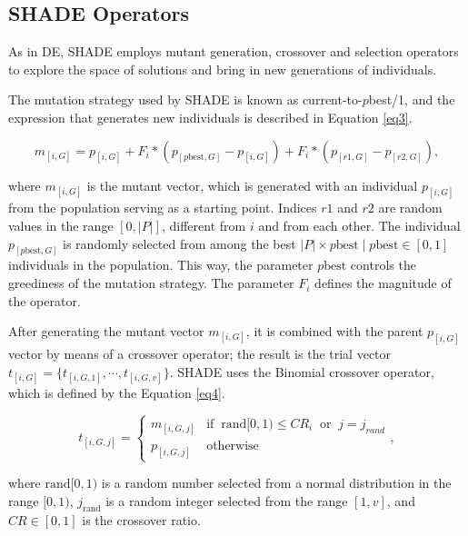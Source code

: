 \subsection{SHADE Operators}

As in \acs{DE}, \acs{SHADE} employs mutant generation, crossover and selection operators to explore the space of solutions and bring in new generations of individuals.

The mutation strategy used by \acs{SHADE} is known as current-to-$p$best/1, and the expression that generates new individuals is described in Equation \eqref{eq3}.

\begin{equation}
m_{[i,G]} = p_{[i,G]} + F_i * (p_{[p\text{best}, G]} - p_{[i,G]}) + F_i * (p_{[r1, G]} - p_{[r2,G]}),
\label{eq3}
\end{equation}

\noindent where $m_{[i,G]}$ is the mutant vector, which is generated with an individual $p_{[i,G]}$ from the population serving as a starting point. Indices $r1$ and $r2$ are random values in the range $[0,|P|]$, different from $i$ and from each other. The individual $p_{[p\text{best}, G]}$ is randomly selected from among the best $|P| \times p\text{best}\;|\;p\text{best}\in [0,1]$ individuals in the population. This way, the parameter $p\text{best}$ controls the greediness of the mutation strategy. The parameter $F_i$ defines the magnitude of the operator.

After generating the mutant vector $m_{[i,G]}$, it is combined with the parent $p_{[i,G]}$ vector by means of a crossover operator; the result is the trial vector $t_{[i,G]} = \{t_{[i,G,1]}, \cdots, t_{[i,G,v]}\}$. \acs{SHADE} uses the Binomial crossover operator, which is defined by the Equation \eqref{eq4}.

\begin{equation}
t_{[i,G,j]} = \left\{ \begin{array}{lc}
m_{[i,G,j]} &   \text{if} \;\; \text{rand}[0,1) \le CR_i \;\; \text{or} \;\;j = j_{rand} \\
p_{[i,G,j]} &  \text{otherwise}
\end{array}
\right.,
\label{eq4}
\end{equation}

\noindent where $\text{rand}[0,1)$ is a random number selected from a normal distribution in the range $[0,1)$, $j_\text{rand}$ is a random integer selected from the range $[1,v]$, and $CR \in [0,1]$ is the crossover ratio.

